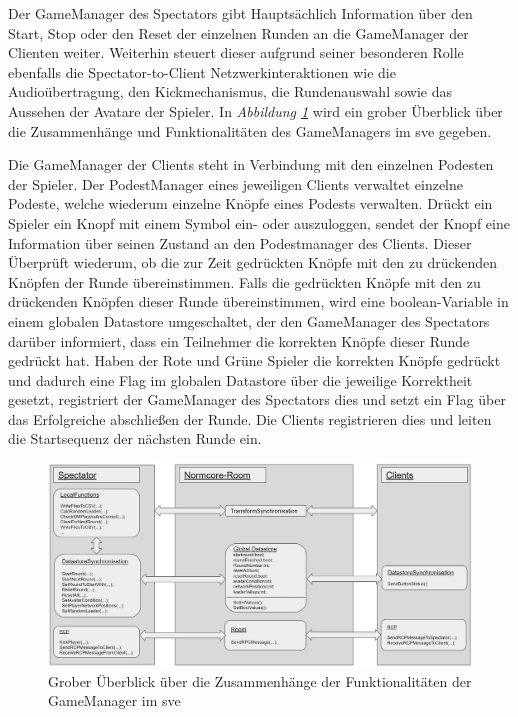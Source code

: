 \documentclass[a4paper,11pt]{article}%
\renewcommand{\\}{\vspace*{0.5\baselineskip} \newline}
\begin{document}
Der GameManager des Spectators gibt Hauptsächlich  Information über den Start, Stop oder den Reset der einzelnen Runden an die GameManager der Clienten weiter. Weiterhin steuert dieser aufgrund seiner besonderen Rolle ebenfalls die Spectator-to-Client Netzwerkinteraktionen wie die Audioübertragung, den Kickmechanismus, die Rundenauswahl sowie das Aussehen der Avatare der Spieler.
In \textit{Abbildung \ref{GameManagerClientSpectator}} wird ein grober Überblick über die Zusammenhänge und Funktionalitäten des GameManagers im \ac{sve} gegeben.

Die GameManager der Clients steht in Verbindung mit den einzelnen Podesten der Spieler. Der PodestManager eines jeweiligen Clients verwaltet einzelne Podeste, welche wiederum  einzelne Knöpfe eines Podests verwalten. 
Drückt ein Spieler ein Knopf mit einem Symbol ein- oder auszuloggen, sendet der Knopf eine Information über seinen Zustand an den Podestmanager des Clients. Dieser Überprüft wiederum, ob die zur Zeit gedrückten Knöpfe mit den zu drückenden Knöpfen der Runde übereinstimmen. Falls die gedrückten Knöpfe mit den zu drückenden Knöpfen dieser Runde übereinstimmen, wird eine boolean-Variable in einem globalen Datastore umgeschaltet, der den GameManager des Spectators darüber informiert, dass ein Teilnehmer die korrekten Knöpfe dieser Runde gedrückt hat. Haben der \dq{}Rote und Grüne\dq{} Spieler die korrekten Knöpfe gedrückt und dadurch eine Flag im globalen Datastore über die jeweilige Korrektheit gesetzt, registriert der GameManager des Spectators dies und setzt ein Flag über das Erfolgreiche abschließen der Runde. Die Clients registrieren dies und leiten die Startsequenz der nächsten Runde ein. 

\begin{figure}[H]
		\begin{footnotesize}
		\centering
			\includegraphics[width=\textwidth]{Abbildungen/GameManagerClientSpectator.jpg}
			
			\caption[Abbildung 1]{Grober Überblick über die Zusammenhänge der Funktionalitäten der GameManager im \ac{sve}}
			\label{GameManagerClientSpectator}
		\end{footnotesize}
	\end{figure}
\end{document}
